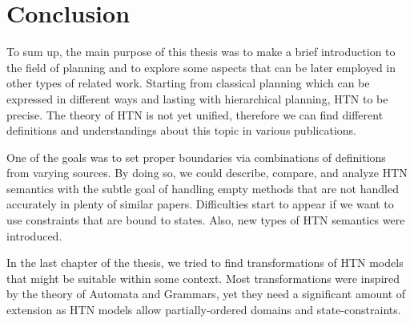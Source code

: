 \chapter*{Conclusion}

\noindent
To sum up, the main purpose of this thesis was to make a brief introduction to the field of planning and to explore some aspects that can be later employed in other types of related work. Starting from classical planning which can be expressed in different ways and lasting with hierarchical planning, HTN to be precise. The theory of HTN is not yet unified, therefore we can find different definitions and understandings about this topic in various publications. 

\medskip\noindent
One of the goals was to set proper boundaries via combinations of definitions from varying sources. By doing so, we could describe, compare, and analyze HTN semantics with the subtle goal of handling empty methods that are not handled accurately in plenty of similar papers. Difficulties start to appear if we want to use constraints that are bound to states. Also, new types of HTN semantics were introduced.

\medskip\noindent
In the last chapter of the thesis, we tried to find transformations of HTN models that might be suitable within some context. Most transformations were inspired by the theory of Automata and Grammars, yet they need a significant amount of extension as HTN models allow partially-ordered domains and state-constraints.    

